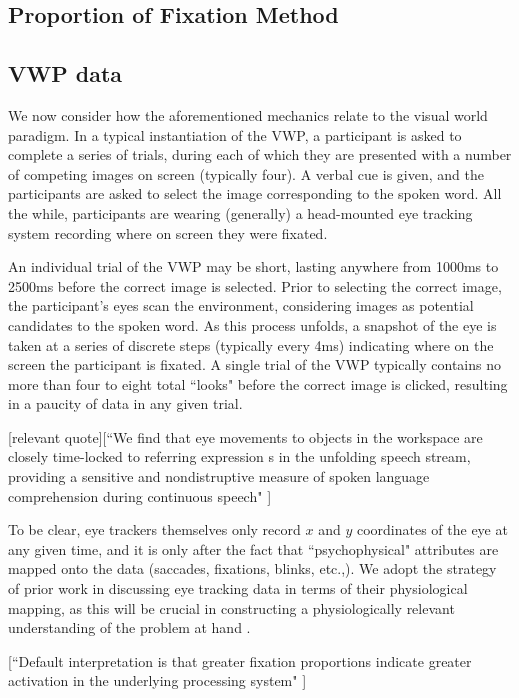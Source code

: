 \subsection{Proportion of Fixation Method}

\subsection{VWP data}


We now consider how the aforementioned mechanics relate to the visual world paradigm. In a typical instantiation of the VWP, a participant is asked to complete a series of trials, during each of which they are presented with a number of competing images on screen (typically four). A verbal cue is given, and the participants are asked to select the image corresponding to the spoken word. All the while, participants are wearing (generally) a head-mounted eye tracking system recording where on screen they were fixated. 

An individual trial of the VWP may be short, lasting anywhere from 1000ms to 2500ms before the correct image is selected. Prior to selecting the correct image, the participant's eyes scan the environment, considering images as potential candidates to the spoken word. As this process unfolds, a snapshot of the eye is taken at a series of discrete steps (typically every 4ms) indicating where on the screen the participant is fixated. A single trial of the VWP typically contains no more than four to eight total ``looks" before the correct image is clicked, resulting in a paucity of data in any given trial.

[relevant quote][``We find that eye movements to objects in the workspace are closely time-locked to referring expression s in the unfolding speech stream, providing a sensitive and nondistruptive measure of spoken language comprehension during continuous speech" \cite{allopenna1998tracking}]

To be clear, eye trackers themselves only record $x$ and $y$ coordinates of the eye at any given time, and it is only after the fact that ``psychophysical" attributes are mapped onto the data (saccades, fixations, blinks, etc.,). We adopt the strategy of prior work in discussing eye tracking data in terms of their physiological mapping, as this will be crucial in constructing a physiologically relevant understanding of the problem at hand \cite{mcmurray2002look}.

[``Default interpretation is that greater fixation proportions indicate greater activation in the underlying processing system" \cite{Magnuson2019}]


